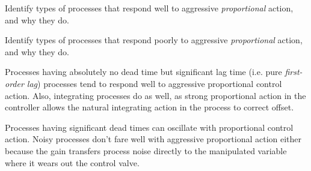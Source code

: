 

Identify types of processes that respond well to aggressive {\it proportional} action, and why they do.

\vskip 200pt

Identify types of processes that respond poorly to aggressive {\it proportional} action, and why they do.

\vfil

\eject






Processes having absolutely no dead time but significant lag time (i.e. pure {\it first-order lag}) processes tend to respond well to aggressive proportional control action.  Also, integrating processes do as well, as strong proportional action in the controller allows the natural integrating action in the process to correct offset.

\vskip 10pt

Processes having significant dead times can oscillate with proportional control action.  Noisy processes don't fare well with aggressive proportional action either because the gain transfers process noise directly to the manipulated variable where it wears out the control valve.












